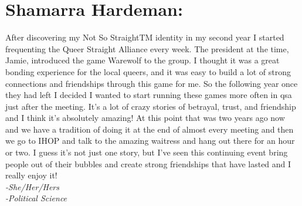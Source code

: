\section*{Shamarra Hardeman:}
After discovering my Not So StraightTM identity in my second year I started 
frequenting the Queer Straight Alliance every week. The president at the time, 
Jamie, introduced the game Warewolf to the group. I thought it was a great 
bonding experience for the local queers, and it was easy to build a lot of 
strong connections and friendships through this game for me. So the following 
year once they had left I decided I wanted to start running these games more 
often in qsa just after the meeting. It's a lot of crazy stories of betrayal, 
trust, and friendship and I think it's absolutely amazing! At this point that 
was two years ago now and we have a tradition of doing it at the end of almost 
every meeting and then we go to IHOP and talk to the amazing waitress and hang 
out there for an hour or two. I guess it's not just one story, but I've seen 
this continuing event bring people out of their bubbles and create strong 
friendships that have lasted and I really enjoy it! \\
\textit{-She/Her/Hers} \\
\textit{-Political Science}

